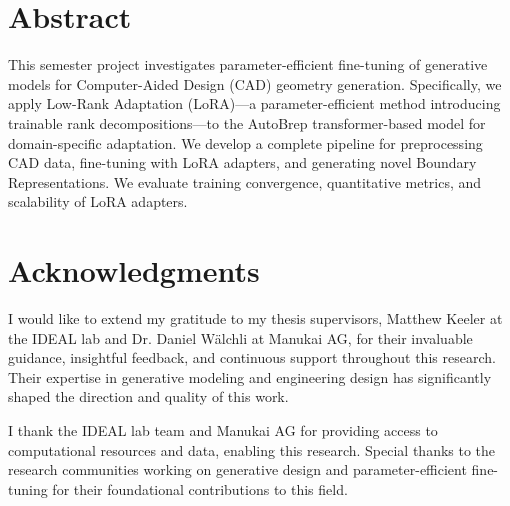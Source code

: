 \documentclass[12pt,a4paper]{article}
\begin{document}
    


    \setcounter{page}{1}

    \section*{Abstract}
    This semester project investigates parameter-efficient fine-tuning of generative models for Computer-Aided Design (CAD) geometry generation. Specifically, we apply Low-Rank Adaptation (LoRA)---a parameter-efficient method introducing trainable rank decompositions---to the AutoBrep transformer-based model for domain-specific adaptation. We develop a complete pipeline for preprocessing CAD data, fine-tuning with LoRA adapters, and generating novel Boundary Representations. We evaluate training convergence, quantitative metrics, and scalability of LoRA adapters.
    \clearpage

    \section*{Acknowledgments}
    I would like to extend my gratitude to my thesis supervisors, Matthew Keeler at the IDEAL lab and Dr. Daniel Wälchli at Manukai AG, for their invaluable guidance, insightful feedback, and continuous support throughout this research. Their expertise in generative modeling and engineering design has significantly shaped the direction and quality of this work.

    \par

    I thank the IDEAL lab team and Manukai AG for providing access to computational resources and data, enabling this research. Special thanks to the research communities working on generative design and parameter-efficient fine-tuning for their foundational contributions to this field.

    \par
\end{document}
